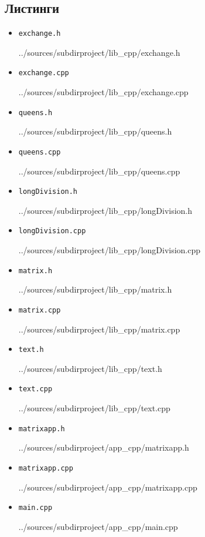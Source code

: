 \documentclass[12pt,a4paper]{report}
\begin{document}
\subsection*{Листинги}
\begin{itemize}


\item[] \verb-exchange.h-

{../sources/subdirproject/lib_cpp/exchange.h}

\item[] \verb-exchange.cpp-

{../sources/subdirproject/lib_cpp/exchange.cpp}

\item[] \verb-queens.h-

{../sources/subdirproject/lib_cpp/queens.h}

\item[] \verb-queens.cpp-

{../sources/subdirproject/lib_cpp/queens.cpp}

\item[] \verb-longDivision.h-

{../sources/subdirproject/lib_cpp/longDivision.h}

\item[] \verb-longDivision.cpp-

{../sources/subdirproject/lib_cpp/longDivision.cpp}

\item[] \verb-matrix.h-

{../sources/subdirproject/lib_cpp/matrix.h}

\item[] \verb-matrix.cpp-

{../sources/subdirproject/lib_cpp/matrix.cpp}

\item[] \verb-text.h-

{../sources/subdirproject/lib_cpp/text.h}

\item[] \verb-text.cpp-

{../sources/subdirproject/lib_cpp/text.cpp}

\item[] \verb-matrixapp.h-

{../sources/subdirproject/app_cpp/matrixapp.h}

\item[] \verb-matrixapp.cpp-

{../sources/subdirproject/app_cpp/matrixapp.cpp}

\item[] \verb-main.cpp-

{../sources/subdirproject/app_cpp/main.cpp}
\end{itemize}
\end{document}
